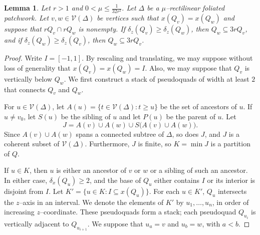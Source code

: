 \documentclass[11pt,reqno]{amsart}
\newcommand{\cV}{\mathcal{V}}
\newcommand{\0}{\mathbf{0}}
\renewcommand{\1}{\mathbf 1}
\renewcommand{\mid}{:}
\renewcommand{\subset}{\subseteq}
\renewcommand{\ge}{\geqslant}
\renewcommand{\le}{\leqslant}
\newtheorem{lemma}[thm]{Lemma}
\theoremstyle{remark}
\begin{document}
\begin{lemma}\label{lem:pseudoquad expansions}
  Let $r>1$ and $0<\mu\le \frac{1}{32r^2}$.  Let $\Delta$ be a $\mu$--rectilinear foliated patchwork.  Let $v,w\in \cV(\Delta)$ be vertices such that $x(Q_{v})=x(Q_{w})$ and suppose that $rQ_{v} \cap rQ_{w}$ is nonempty. If $\delta_z(Q_v)\ge \delta_z(Q_w)$, then $Q_{w}\subset 3r Q_{v}$, and  if $\delta_z(Q_w)\ge \delta_z(Q_v)$, then $Q_{w}\subset 3r Q_{v}$.
\end{lemma}
\begin{proof}
  Write $I=[-1,1]$.  By rescaling and translating, we may suppose without loss of generality  that $x(Q_{v})=x(Q_{w})=I$.  Also,  we may suppose that $Q_v$ is vertically below $Q_w$.  We first construct a stack of pseudoquads of width at least $2$ that connects $Q_v$ and $Q_w$.

  For $u\in \cV(\Delta)$, let $A(u)=\{t\in \cV(\Delta)\mid t\ge u\}$ be the set of ancestors of $u$.  If $u\ne v_0$, let $S(u)$ be the sibling of $u$ and let $P(u)$ be the parent of $u$.  Let
  $$J=A(v)\cup A(w) \cup S\big(A(v)\cup A(w)\big).$$
  Since $A(v)\cup A(w)$ spans a connected subtree of $\Delta$, so does $J$, and $J$ is a coherent subset of $\cV(\Delta)$.  Furthermore, $J$ is finite, so $K=\min J$ is a partition of $Q$.

  If $u\in K$, then $u$ is either an ancestor of $v$ or $w$ or a sibling of such an ancestor.  In either case, $\delta_x(Q_u)\ge 2$, and the base of $Q_u$ either contains $I$ or its interior is disjoint from $I$.  Let $K'=\{u\in K\mid I\subset x(Q_u)\}$.  For each $u\in K'$, $Q_{u}$ intersects the $z$--axis in an interval.  We denote the elements of $K'$ by $u_1,\dots, u_n$, in order of increasing $z$--coordinate.  These pseudoquads form a stack; each pseudoquad $Q_{u_{i}}$ is vertically adjacent to $Q_{u_{i+1}}$.  We suppose that $u_a=v$ and $u_b=w$, with $a<b$.


\end{proof}
\end{document}
